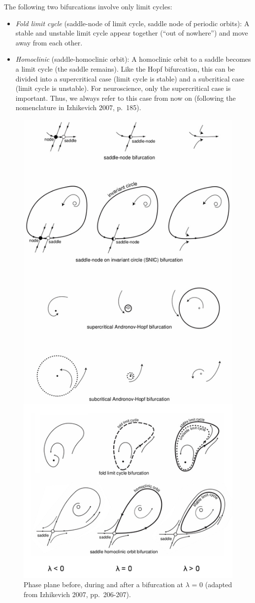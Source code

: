 \documentclass[12pt,a4paper,]{report}
\begin{document}
The following two bifurcations involve only limit cycles:

\begin{itemize}
\item
  \emph{Fold limit cycle} (saddle-node of limit cycle, saddle node of
  periodic orbits): A stable and unstable limit cycle appear together
  (``out of nowhere'') and move away from each other.
\item
  \emph{Homoclinic} (saddle-homoclinic orbit): A homoclinic orbit to a
  saddle becomes a limit cycle (the saddle remains). Like the Hopf
  bifurcation, this can be divided into a supercritical case (limit
  cycle is stable) and a subcritical case (limit cycle is unstable). For
  neuroscience, only the supercritical case is important. Thus, we
  always refer to this case from now on (following the nomenclature in
  Izhikevich 2007, p.~185).
\end{itemize}

\begin{figure}
\centering
\includegraphics[width=0.600\hsize]{images/bifurcations.png}
\caption[Phase plane before, during and after a bifurcation]{Phase plane before, during and after a bifurcation at
$\lambda$ = 0 (adapted from Izhikevich 2007,
pp.~206-207).}\label{bifurcations-phase-plane}
\end{figure}
\end{document}
